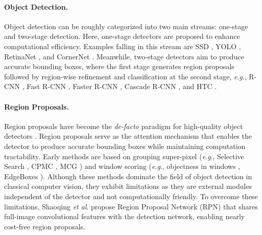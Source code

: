 \documentclass{article}
\newcommand{\etal}{\textit{et al}. }
\newcommand{\eg}{\textit{e}.\textit{g}., }
\begin{document}
	\paragraph{Object Detection.} Object detection can be roughly categorized into two main streams: one-stage and two-stage detection. Here, one-stage detectors are proposed to enhance computational efficiency. Examples falling in this stream are SSD \citep{SSD}, YOLO \citep{Redmon_2016_CVPR,Redmon_2017_CVPR,YOLOV3}, RetinaNet \citep{Lin_2017_ICCV}, and CornerNet \citep{Law_2018_ECCV}. Meanwhile, two-stage detectors aim to produce accurate bounding boxes, where the first stage generates region proposals followed by region-wise refinement and classification at the second stage, \eg R-CNN \citep{Girshick_2014_CVPR}, Fast R-CNN \citep{Fast_RCNN}, Faster R-CNN \citep{NIPS2015_5638}, Cascade R-CNN \citep{Cai_2018_CVPR}, and HTC \cite{chen2019hybrid}. 
	
	\paragraph{Region Proposals.} Region proposals have become the \textit{de-facto} paradigm for high-quality object detectors \citep{chavali2016object,7182356,hosang2014good}. Region proposals serve as the attention mechanism that enables the detector to produce accurate bounding boxes while maintaining computation tractability. Early methods are based on grouping super-pixel (\eg Selective Search \citep{uijlings2013selective}, CPMC \citep{carreira2011cpmc}, MCG \citep{arbelaez2014multiscale}) and window scoring (\eg objectness in windows \citep{alexe2012measuring}, EdgeBoxes \citep{zitnick2014edge}). Although these methods dominate the field of object detection in classical computer vision, they exhibit limitations as they are external modules independent of the detector and not computationally friendly. To overcome these limitations, Shaoqing \etal \citep{NIPS2015_5638} propose Region Proposal Network (RPN) that shares full-image convolutional features with the detection network, enabling nearly cost-free region proposals. 
	
\end{document}
